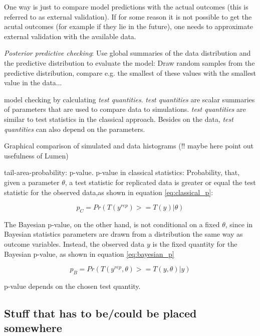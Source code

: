 \documentclass{article}
\begin{document}
One way is just to compare model predictions with the actual outcomes (this is referred to as external validation). If for some reason it is not possible to get the acutal outcomes (for example if they lie in the future), one needs to approximate external validation with the available data.

\textit{Posterior predictive checking}: Use global summaries of the data distribution and the predictive distribution to evaluate the model: Draw random samples from the predictive distribution, compare e.g. the smallest of these values with the smallest value in the data...

model checking by calculating \textit{test quantities}. \textit{test quantities} are scalar summaries of parameters that are used to compare data to simulations. \textit{test quantities} are similar to test statistics in the classical approach. Besides on the data, \textit{test quantities} can also depend on the parameters.

Graphical comparison of simulated and data histograms (!! maybe here point out usefulness of Lumen)

tail-area-probability: p-value. p-value in classical statistics: Probability, that, given a parameter $\theta$, a test statistic for replicated data is greater or equal the test statistic for the observed data,as shown in equation \ref{eq:classical_p}:

\begin{equation}
p_C = Pr(T(y^{rep}) >= T(y) | \theta)
\label{eq:classical_p}
\end{equation}

\cite{1439840954}

The Bayesian p-value, on the other hand, is not conditional on a fixed $\theta$, since in Bayesian statistics parameters are drawn from a distribution the same way as outcome variables. Instead, the observed data $y$ is the fixed quantity for the Bayesian p-value, as shown in equation \ref{eq:bayesian_p}

\begin{equation}
p_B = Pr(T(y^{rep},\theta) >= T(y,\theta) | y)
\label{eq:bayesian_p}
\end{equation}

p-value depends on the chosen test quantity.

\subsection{Stuff that has to be/could be placed somewhere}
\end{document}
